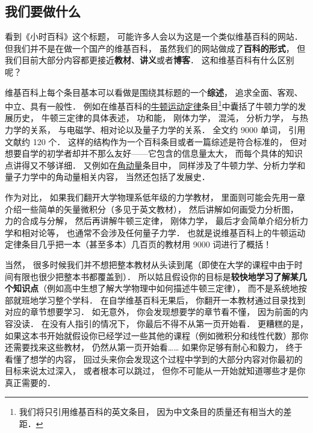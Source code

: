 
\subsection{我们要做什么}

看到《小时百科》这个标题， 可能许多人会以为这是一个类似维基百科的网站． 但我们并不是在做一个国产的维基百科， 虽然我们的网站做成了\textbf{百科的形式}， 但我们目前大部分内容都更接近\textbf{教材}、\textbf{讲义}或者\textbf{博客}． 这和维基百科有什么区别呢？

维基百科上每个条目基本可以看做是围绕其标题的一个\textbf{综述}， 追求全面、客观、中立、具有一般性． 例如在维基百科的\href{https://en.wikipedia.org/wiki/Newton's_laws_of_motion}{牛顿运动定律}条目\footnote{我们将只引用维基百科的英文条目， 因为中文条目的质量还有相当大的差距．}中囊括了牛顿力学的发展历史， 牛顿三定律的具体表述， 功和能， 刚体力学， 混沌， 分析力学， 与热力学的关系， 与电磁学、相对论以及量子力学的关系． 全文约 9000 单词， 引用文献约 120 个． 这样的结构作为一个百科条目或者一篇综述是符合标准的， 但对想要自学的初学者却并不那么友好——它包含的信息量太大， 而每个具体的知识点讲得又不够详细． 又例如在\href{https://en.wikipedia.org/wiki/Angular_momentum}{角动量}条目中， 同样涉及了牛顿力学、分析力学和量子力学中的角动量相关内容， 当然还包括了发展史．

作为对比， 如果我们翻开大学物理系低年级的力学教材， 里面则可能会先用一章介绍一些简单的矢量微积分（多见于英文教材）， 然后讲解如何画受力分析图， 力的合成与分解， 然后再讲解牛顿三定律， 刚体力学， 最后才会简单介绍分析力学和相对论等， 也通常不会涉及任何量子力学． 也就是说维基百科上的牛顿运动定律条目几乎把一本（甚至多本）几百页的教材用 9000 词进行了概括！

当然， 很多时候我们并不想把整本教材从头读到尾（即使在大学的课程中由于时间有限也很少把整本书都覆盖到）． 所以姑且假设你的目标是\textbf{较快地学习了解某几个知识点}（例如高中生想了解大学物理中如何描述牛顿三定律）， 而不是系统地按部就班地学习整个学科． 在自学维基百科无果后， 你翻开一本教材通过目录找到对应的章节想要学习． 如无意外， 你会发现想要学的章节看不懂， 因为前面的内容没读． 在没有人指引的情况下， 你最后不得不从第一页开始看． 更糟糕的是， 如果这本书开始就假设你已经学过一些其他的课程（例如微积分和线性代数）那你还需要找来这些教材， 仍然从第一页开始看…… 如果你足够有耐心和毅力， 终于看懂了想学的内容， 回过头来你会发现这个过程中学到的大部分内容对你最初的目标来说太过深入， 或者根本可以跳过， 但你不可能从一开始就知道哪些才是你真正需要的．

